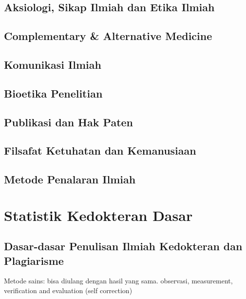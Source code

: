 \documentclass[
  letterpaper,
  DIV=11,
  numbers=noendperiod]{scrreprt}
\begin{document}
\section{Aksiologi, Sikap Ilmiah dan Etika
Ilmiah}\label{aksiologi-sikap-ilmiah-dan-etika-ilmiah}

\section{Complementary \& Alternative
Medicine}\label{complementary-alternative-medicine}

\section{Komunikasi Ilmiah}\label{komunikasi-ilmiah}

\section{Bioetika Penelitian}\label{bioetika-penelitian}

\section{Publikasi dan Hak Paten}\label{publikasi-dan-hak-paten}

\section{Filsafat Ketuhatan dan
Kemanusiaan}\label{filsafat-ketuhatan-dan-kemanusiaan}

\section{Metode Penalaran Ilmiah}\label{metode-penalaran-ilmiah}

\chapter{Statistik Kedokteran Dasar}\label{statistik-kedokteran-dasar}

\section{Dasar-dasar Penulisan Ilmiah Kedokteran dan
Plagiarisme}\label{dasar-dasar-penulisan-ilmiah-kedokteran-dan-plagiarisme}

Metode sains: bisa diulang dengan hasil yang sama. observasi,
measurement, verification and evaluation (self correction)
\end{document}
